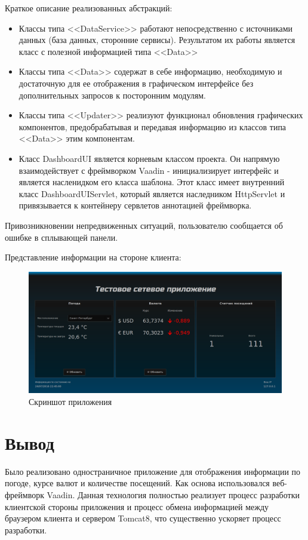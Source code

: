 \documentclass{article}
\begin{document}
\begin{spacing}{2.0}
Краткое описание реализованных абстракций:
\begin{itemize}
\item Классы типа <<DataService>> работают непосредственно с источниками данных (база данных, сторонние сервисы). Результатом их работы является класс с полезной информацией типа <<Data>>
\item Классы типа <<Data>> содержат в себе информацию, необходимую и достаточную для ее отображения в графическом интерфейсе без дополнительных запросов к посторонним модулям.
\item Классы типа <<Updater>> реализуют функционал обновления графических компонентов, предобрабатывая и передавая информацию из классов типа <<Data>> этим компонентам.
\item Класс DashboardUI является корневым классом проекта. Он напрямую взаимодействует с фреймворком Vaadin - инициализирует интерфейс и является насленидком его класса шаблона. Этот класс имеет внутренний класс DashboardUIServlet, который является 
наследником HttpServlet и привязывается к контейнеру сервлетов аннотацией фреймворка.
\end{itemize}

Привозникновении непредвиженных ситуаций, пользователю сообщается 
об ошибке в сплывающей панели.

Представление информации на стороне клиента:

\begin{figure}[h]
\centering
\includegraphics[width=\textwidth]{screenshot}
\caption{Скриншот приложения}
\end{figure}

\section*{Вывод}
Было реализовано одностраничное приложение для отображения информации по погоде, курсе валют и количестве посещений.
Как основа использовался веб-фреймворк Vaadin. Данная технология 
полностью реализует процесс разработки клиентской стороны приложения
и процесс обмена информацией между браузером клиента и сервером Tomcat8, что существенно ускоряет процесс разработки.
\pagebreak


\end{spacing}
\end{document}
